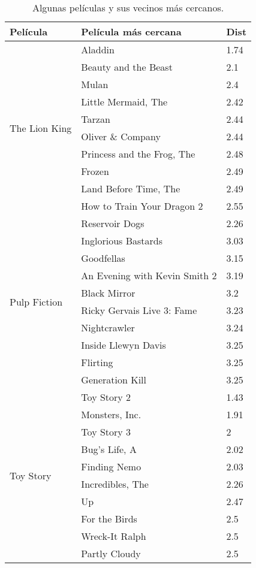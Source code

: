 \begin{table}[H]
	\centering
	\caption{Algunas películas y sus vecinos más cercanos.}
	\label{tab:ML_vecinos_cercanos_2}
	\begin{tabular}{ |l|l|l| }
		\hline
		\textbf{Película} & \textbf{Película más cercana} & \textbf{Dist} \\ \hline
		\multirow{10}{*}{The Lion King } &  Aladdin   &  1.74  \\
		 &  Beauty and the Beast   &  2.1  \\
		 &  Mulan   &  2.4  \\
		 &  Little Mermaid, The   &  2.42  \\
		 &  Tarzan   &  2.44  \\
		 &  Oliver \& Company   &  2.44  \\
		 &  Princess and the Frog, The   &  2.48  \\
		 &  Frozen   &  2.49  \\
		 &  Land Before Time, The   &  2.49  \\
		 &  How to Train Your Dragon 2   &  2.55  \\
		\hline
		\multirow{10}{*}{ Pulp Fiction  } &  Reservoir Dogs   &  2.26  \\
		 &  Inglorious Bastards   &  3.03  \\
		 &  Goodfellas   &  3.15  \\
		 &  An Evening with Kevin Smith 2   &  3.19  \\
		 &  Black Mirror   &  3.2  \\
		 &  Ricky Gervais Live 3: Fame   &  3.23  \\
		 &  Nightcrawler   &  3.24  \\
		 &  Inside Llewyn Davis   &  3.25  \\
		 &  Flirting   &  3.25  \\
		 &  Generation Kill   &  3.25  \\
		\hline
		\multirow{10}{*}{ Toy Story  } &  Toy Story 2   &  1.43  \\
		 &  Monsters, Inc.   &  1.91  \\
		 &  Toy Story 3   &  2  \\
		 &  Bug's Life, A   &  2.02  \\
		 &  Finding Nemo   &  2.03  \\
		 &  Incredibles, The   &  2.26  \\
		 &  Up   &  2.47  \\
		 &  For the Birds   &  2.5  \\
		 &  Wreck-It Ralph   &  2.5  \\
		 &  Partly Cloudy   &  2.5  \\
		\hline
	\end{tabular}
\end{table}




